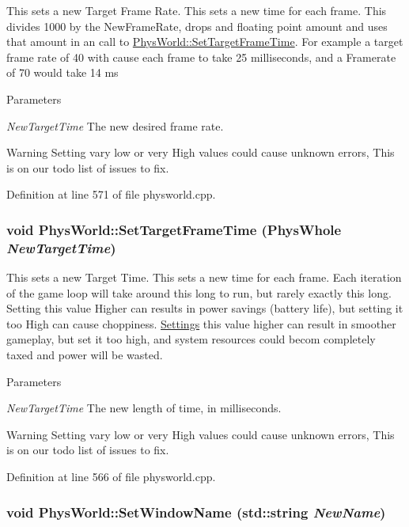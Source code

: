 This sets a new Target Frame Rate. This sets a new time for each frame. This divides 1000 by the NewFrameRate, drops and floating point amount and uses that amount in an call to \hyperlink{classPhysWorld_ab1c6f9286bd97eb502d8b0ddc4954566}{PhysWorld::SetTargetFrameTime}. For example a target frame rate of 40 with cause each frame to take 25 milliseconds, and a Framerate of 70 would take 14 ms 
\begin{DoxyParams}{Parameters}
\item[{\em NewTargetTime}]The new desired frame rate. \end{DoxyParams}
\begin{DoxyWarning}{Warning}
Setting vary low or very High values could cause unknown errors, This is on our todo list of issues to fix. 
\end{DoxyWarning}


Definition at line 571 of file physworld.cpp.\hypertarget{classPhysWorld_ab1c6f9286bd97eb502d8b0ddc4954566}{
\subsubsection[{SetTargetFrameTime}]{\setlength{\rightskip}{0pt plus 5cm}void PhysWorld::SetTargetFrameTime (PhysWhole {\em NewTargetTime})}}
\label{db/df5/classPhysWorld_ab1c6f9286bd97eb502d8b0ddc4954566}


This sets a new Target Time. This sets a new time for each frame. Each iteration of the game loop will take around this long to run, but rarely exactly this long. Setting this value Higher can results in power savings (battery life), but setting it too High can cause choppiness. \hyperlink{classSettings}{Settings} this value higher can result in smoother gameplay, but set it too high, and system resources could becom completely taxed and power will be wasted. 
\begin{DoxyParams}{Parameters}
\item[{\em NewTargetTime}]The new length of time, in milliseconds. \end{DoxyParams}
\begin{DoxyWarning}{Warning}
Setting vary low or very High values could cause unknown errors, This is on our todo list of issues to fix. 
\end{DoxyWarning}


Definition at line 566 of file physworld.cpp.\hypertarget{classPhysWorld_adb5ba2b5a3140c5d7033d3180e3f7342}{
\subsubsection[{SetWindowName}]{\setlength{\rightskip}{0pt plus 5cm}void PhysWorld::SetWindowName (std::string {\em NewName})}}
\label{db/df5/classPhysWorld_adb5ba2b5a3140c5d7033d3180e3f7342}


